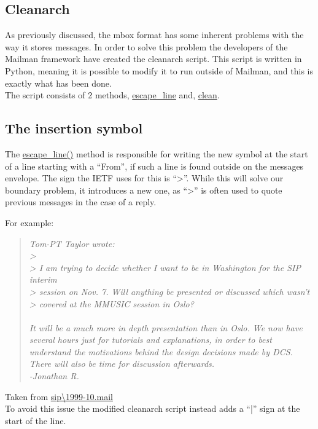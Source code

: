 \documentclass[a4paper,english]{report}
\begin{document}
\subsection{Cleanarch}

As previously discussed, the mbox format has some inherent problems with the way it stores messages. In order to solve this problem the developers of the Mailman framework have created the cleanarch script. This script is written in Python, meaning it is possible to modify it to run outside of Mailman, and this is exactly what has been done.\\


The script consists of 2 methods, \url{escape_line} and, \url{clean}.\

\subsection{The insertion symbol }

The \url{escape_line()} method is responsible for writing the new symbol at the start of a line starting with a “From”, if such a line is found outside on the messages envelope. The sign the IETF uses for this is “>”. While this will solve our boundary problem, it introduces a new one, as “>” is often used to quote previous messages in the case of a reply.

For example:
\begin{quotation}


\textit{
\noindent
Tom-PT Taylor wrote:\\
> \\
> I am trying to decide whether I want to be in Washington for the SIP interim\\
> session on Nov. 7.  Will anything be presented or discussed which wasn't\\
> covered at the MMUSIC session in Oslo?\\\\
\noindent
It will be a much more in depth presentation than in Oslo. We now have
several hours just for tutorials and explanations, in order to best
understand the motivations behind the design decisions made by DCS.
There will also be time for discussion afterwards.\\
\noindent
-Jonathan R.}
\end{quotation}

Taken from  \url{sip\1999-10.mail}\\

To avoid this issue the modified cleanarch script instead adds a “|” sign at the start of the line.\\
\end{document}
